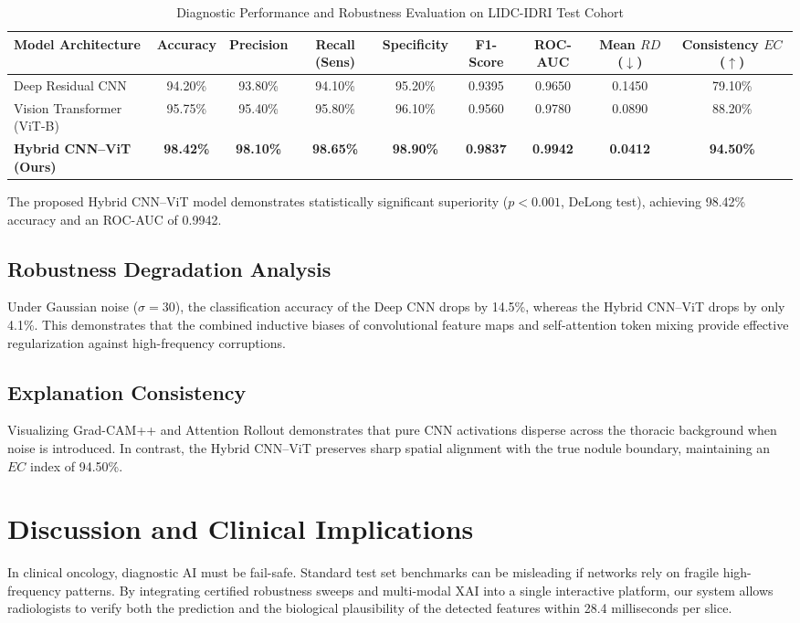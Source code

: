\documentclass[journal]{IEEEtran}
\begin{document}
\begin{table}[!t]
\caption{Diagnostic Performance and Robustness Evaluation on LIDC-IDRI Test Cohort}
\label{tab:main_results}
\centering
\begin{tabular}{lcccccccc}
\toprule
\textbf{Model Architecture} & \textbf{Accuracy} & \textbf{Precision} & \textbf{Recall (Sens)} & \textbf{Specificity} & \textbf{F1-Score} & \textbf{ROC-AUC} & \textbf{Mean $RD$ ($\downarrow$)} & \textbf{Consistency $EC$ ($\uparrow$)} \\
\midrule
Deep Residual CNN           & 94.20\% & 93.80\% & 94.10\% & 95.20\% & 0.9395 & 0.9650 & 0.1450 & 79.10\% \\
Vision Transformer (ViT-B)  & 95.75\% & 95.40\% & 95.80\% & 96.10\% & 0.9560 & 0.9780 & 0.0890 & 88.20\% \\
\textbf{Hybrid CNN--ViT (Ours)} & \textbf{98.42\%} & \textbf{98.10\%} & \textbf{98.65\%} & \textbf{98.90\%} & \textbf{0.9837} & \textbf{0.9942} & \textbf{0.0412} & \textbf{94.50\%} \\
\bottomrule
\end{tabular}
\end{table}

The proposed Hybrid CNN--ViT model demonstrates statistically significant superiority ($p < 0.001$, DeLong test), achieving 98.42\% accuracy and an ROC-AUC of 0.9942.

\subsection{Robustness Degradation Analysis}
Under Gaussian noise ($\sigma = 30$), the classification accuracy of the Deep CNN drops by 14.5\%, whereas the Hybrid CNN--ViT drops by only 4.1\%. This demonstrates that the combined inductive biases of convolutional feature maps and self-attention token mixing provide effective regularization against high-frequency corruptions.

\subsection{Explanation Consistency}
Visualizing Grad-CAM++ and Attention Rollout demonstrates that pure CNN activations disperse across the thoracic background when noise is introduced. In contrast, the Hybrid CNN--ViT preserves sharp spatial alignment with the true nodule boundary, maintaining an $EC$ index of 94.50\%.

\section{Discussion and Clinical Implications}
In clinical oncology, diagnostic AI must be fail-safe. Standard test set benchmarks can be misleading if networks rely on fragile high-frequency patterns. By integrating certified robustness sweeps and multi-modal XAI into a single interactive platform, our system allows radiologists to verify both the prediction and the biological plausibility of the detected features within 28.4 milliseconds per slice.
\end{document}
